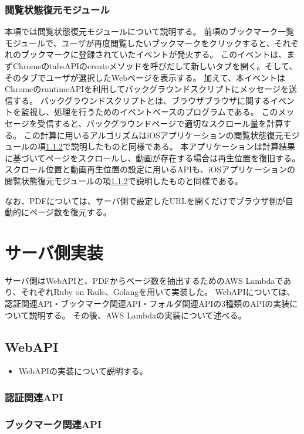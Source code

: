 \subsubsection{閲覧状態復元モジュール}
本項では閲覧状態復元モジュールについて説明する。
前項のブックマーク一覧モジュールで、ユーザが再度閲覧したいブックマークをクリックすると、それぞれのブックマークに登録されていたイベントが発火する。
このイベントは、まずChromeのtabsAPIのcreateメソッドを呼びだして新しいタブを開く。そして、そのタブでユーザが選択したWebページを表示する。
加えて、本イベントはChromeのruntimeAPI\cite{}を利用してバックグラウンドスクリプト\cite{}にメッセージを送信する。
バックグラウンドスクリプトとは、ブラウザブラウザに関するイベントを監視し、処理を行うためのイベントベースのプログラムである\cite{}。
このメッセージを受信すると、バックグラウンドページで適切なスクロール量を計算する。
この計算に用いるアルゴリズムはiOSアプリケーションの閲覧状態復元モジュールの項\ref{}で説明したものと同様である。
本アプリケーションは計算結果に基づいてページをスクロールし、動画が存在する場合は再生位置を復旧する。
スクロール位置と動画再生位置の設定に用いるAPIも、iOSアプリケーションの閲覧状態復元モジュールの項\ref{}で説明したものと同様である。

なお、PDFについては、サーバ側で設定したURLを開くだけでブラウザ側が自動的にページ数を復元する。

\section{サーバ側実装}
サーバ側はWebAPIと、PDFからページ数を抽出するためのAWS Lambdaであり、それぞれRuby on Rails、Golangを用いて実装した。
WebAPIについては、認証関連API・ブックマーク関連API・フォルダ関連APIの3種類のAPIの実装について説明する。
その後、AWS Lambdaの実装について述べる。

\subsection{WebAPI}
\begin{itemize}
  \item WebAPIの実装について説明する。
\end{itemize}

\subsubsection{認証関連API}

\subsubsection{ブックマーク関連API}


